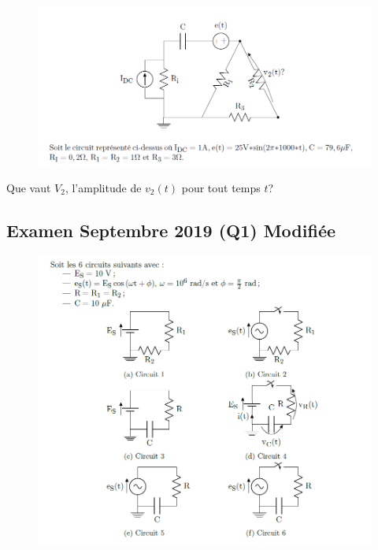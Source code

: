 \begin{figure}[h!]
    \centering
    \includegraphics[width = 17cm]{TpQEx_Circuits/Q4_Sept_2015.PNG}
    \label{fig:Q4_TheoCircuitsSept2015}
\end{figure}
Que vaut $V_2$, l'amplitude de $v_2(t)$ pour tout temps $t$?

\newpage

\subsection{Examen Septembre 2019 (Q1) Modifiée}

\begin{figure}[h!]
    \centering
    \includegraphics[width = 17cm]{TpQEx_Circuits/Q1_Sept_2019.PNG}
    \label{fig:Q1_TheoCircuitsSept2019}
\end{figure}


